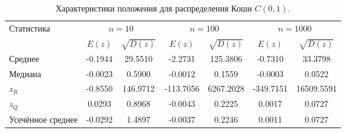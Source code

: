 \begin{table}[H]
\centering
\small
\begin{tabular}{|l|cc|cc|cc|}
\hline
\multirow{2}{*}{Статистика} & \multicolumn{2}{c|}{$n=10$} & \multicolumn{2}{c|}{$n=100$} & \multicolumn{2}{c|}{$n=1000$} \\
\cline{2-7}
 & $E(z)$ & $\sqrt{D(z)}$ & $E(z)$ & $\sqrt{D(z)}$ & $E(z)$ & $\sqrt{D(z)}$ \\
\hline
Среднее & -0.1944 & 29.5510 & -2.2731 & 125.3806 & -0.7310 & 33.3798 \\
\hline
Медиана & -0.0023 & 0.5900 & -0.0012 & 0.1559 & -0.0003 & 0.0522 \\
\hline
$z_R$ & -0.8550 & 146.9712 & -113.7056 & 6267.2028 & -349.7151 & 16509.5591 \\
\hline
$z_Q$ & 0.0293 & 0.8968 & -0.0043 & 0.2225 & 0.0017 & 0.0727 \\
\hline
Усечённое среднее & -0.0292 & 1.4897 & -0.0037 & 0.2246 & 0.0011 & 0.0727 \\
\hline
\end{tabular}
\caption{Характеристики положения для распределения Коши $C(0,1)$.}
\label{tab:cauchy_precise}
\end{table}